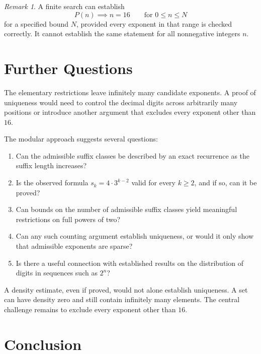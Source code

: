 \documentclass[11pt,a4paper]{article}
\theoremstyle{definition}
\theoremstyle{plain}
\theoremstyle{remark}
\newtheorem{remark}[definition]{Remark}
\begin{document}
\begin{remark}
A finite search can establish
\[
P(n)\implies n=16
\qquad\text{for }0\leq n\leq N
\]
for a specified bound \(N\), provided every exponent in that
range is checked correctly. It cannot establish the same
statement for all nonnegative integers \(n\).
\end{remark}

\section{Further Questions}

The elementary restrictions leave infinitely many candidate
exponents. A proof of uniqueness would need to control the
decimal digits across arbitrarily many positions or introduce
another argument that excludes every exponent other than \(16\).

The modular approach suggests several questions:

\begin{enumerate}
    \item Can the admissible suffix classes be described by an
    exact recurrence as the suffix length increases?

    \item Is the observed formula
    \(s_k=4\cdot3^{k-2}\) valid for every \(k\geq2\), and if so,
    can it be proved?

    \item Can bounds on the number of admissible suffix classes
    yield meaningful restrictions on full powers of two?

    \item Can any such counting argument establish uniqueness,
    or would it only show that admissible exponents are sparse?

    \item Is there a useful connection with established results
    on the distribution of digits in sequences such as \(2^n\)?
\end{enumerate}

A density estimate, even if proved, would not alone establish
uniqueness. A set can have density zero and still contain
infinitely many elements. The central challenge remains to
exclude every exponent other than \(16\).

\section{Conclusion}
\end{document}
